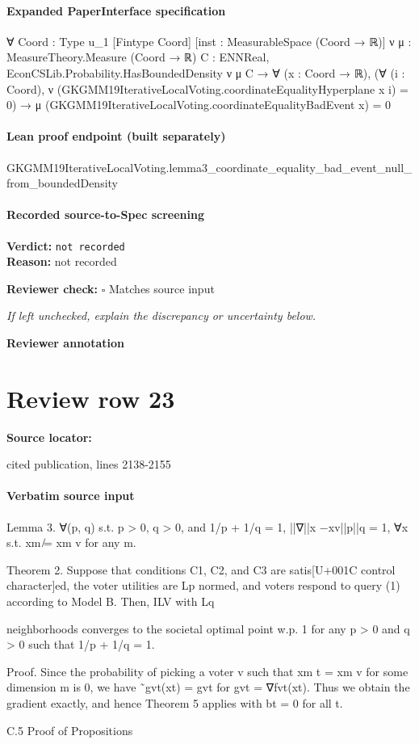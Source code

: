 \documentclass[10pt]{article}
\newcommand{\reviewerbox}{%
  \par\noindent\fbox{\parbox{0.96\linewidth}{\rule{0pt}{0.38in}}}\par
}
\newcommand{\reviewmatch}[1]{%
  \par\noindent\textbf{Reviewer check:} $\square$\; #1\par
  \noindent\emph{If left unchecked, explain the discrepancy or uncertainty below.}\par
}
\begin{document}
\paragraph{Expanded PaperInterface specification}
\begin{ReviewVerbatim}
∀ {Coord : Type u_1} [Fintype Coord] [inst : MeasurableSpace (Coord → ℝ)] {ν μ : MeasureTheory.Measure (Coord → ℝ)}
  {C : ENNReal},
  EconCSLib.Probability.HasBoundedDensity ν μ C →
    ∀ (x : Coord → ℝ),
      (∀ (i : Coord), ν (GKGMM19IterativeLocalVoting.coordinateEqualityHyperplane x i) = 0) →
        μ (GKGMM19IterativeLocalVoting.coordinateEqualityBadEvent x) = 0
\end{ReviewVerbatim}

\paragraph{Lean proof endpoint (built separately)}\begin{ReviewVerbatim}
GKGMM19IterativeLocalVoting.lemma3_coordinate_equality_bad_event_null_from_boundedDensity
\end{ReviewVerbatim}

\paragraph{Recorded source-to-Spec screening}
\textbf{Verdict:} \texttt{not recorded}
\\
\textbf{Reason:} not recorded
\reviewmatch{Matches source input}
\noindent\textbf{Reviewer annotation}\par
\reviewerbox
\clearpage
\hypertarget{source-claim-4de262cc3cbceb90}{}
\section*{Review row 23}
\textbf{Source locator:} {\footnotesize\raggedright cited publication, lines 2138-\allowbreak{}2155\par}
\paragraph{Verbatim source input}
\begin{ReviewVerbatim}
Lemma 3. ∀(p, q) s.t. p > 0, q > 0, and 1/p + 1/q = 1, ||∇||x −xv||p||q = 1, ∀x s.t.
xm ̸= xm
v for any m.

Theorem 2. Suppose that conditions C1, C2, and C3 are satis[U+001C control character]ed, the voter utilities are
Lp normed, and voters respond to query (1) according to Model B. Then, ILV with Lq

neighborhoods converges to the societal optimal point w.p. 1 for any p > 0 and q > 0 such
that 1/p + 1/q = 1.

Proof. Since the probability of picking a voter v such that xm
t = xm
v for some dimension m
is 0, we have ˜gvt(xt) = gvt for gvt = ∇fvt(xt). Thus we obtain the gradient exactly, and
hence Theorem 5 applies with bt = 0 for all t.

C.5 Proof of Propositions
\end{ReviewVerbatim}
\end{document}
